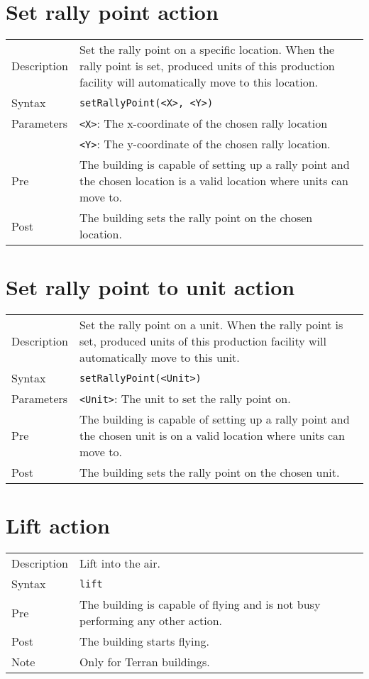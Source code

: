\section{Set rally point action}
\begin{tabularx}{\textwidth}{lX}
 Description & Set the rally point on a specific location. When the rally point is set, produced units of this production facility will automatically move to this location. \\
 Syntax & \verb|setRallyPoint(<X>, <Y>)| \\
 Parameters & \verb|<X>|: The x-coordinate of the chosen rally location \\
            & \verb|<Y>|: The y-coordinate of the chosen rally location. \\
 Pre & The building is capable of setting up a rally point and the chosen location is a valid location where units can move to. \\
 Post & The building sets the rally point on the chosen location.
\end{tabularx}

\section{Set rally point to unit action}
\begin{tabularx}{\textwidth}{lX}
 Description & Set the rally point on a unit. When the rally point is set, produced units of this production facility will automatically move to this unit. \\
 Syntax & \verb|setRallyPoint(<Unit>)| \\
 Parameters & \verb|<Unit>|: The unit to set the rally point on.\\
 Pre & The building is capable of setting up a rally point and the chosen unit is on a valid location where units can move to. \\
 Post & The building sets the rally point on the chosen unit.
\end{tabularx}

\section{Lift action}
\begin{tabularx}{\textwidth}{lX}
 Description & Lift into the air. \\
 Syntax & \verb|lift| \\
 Pre & The building is capable of flying and is not busy performing any other action. \\
 Post & The building starts flying. \\
 Note & Only for Terran buildings.
\end{tabularx}


